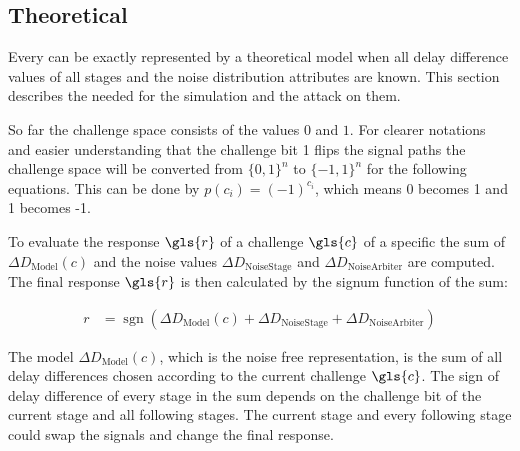 
\subsection{Theoretical}
\label{sec:theoretical}

Every \apuf can be exactly represented by a theoretical model when all delay difference values of all stages and the noise distribution attributes are known.
This section describes the \apufs needed for the simulation and the attack on them.

So far the challenge space consists of the values $0$ and $1$.
For clearer notations and easier understanding that the challenge bit 1 flips the signal paths the challenge space will be converted from $\{0, 1\}^n$ to $\{-1, 1\}^n$ for the following equations.
This can be done by $p(c_i) = (-1)^{c_i}$, which means 0 becomes 1 and 1 becomes -1.

To evaluate the response $\gls{r}$ of a challenge $\gls{c}$ of a specific \puf the sum of $\Delta D_{\mathrm{Model}}(c)$ and the noise values $\Delta D_{\mathrm{Noise Stage}}$ and $\Delta D_{\mathrm{Noise Arbiter}}$ are computed.
The final response $\gls{r}$ is then calculated by the signum function of the sum:

\begin{align}
r &= \operatorname{sgn}(\Delta D_{\mathrm{Model}}(c) + \Delta D_{\mathrm{Noise Stage}} + \Delta D_{\mathrm{Noise Arbiter}}) \label{equ:pufresponse}
\end{align}

The model $\Delta D_{\mathrm{Model}}(c)$, which is the noise free \apuf representation, is the sum of all delay differences chosen according to the current challenge $\gls{c}$.
The sign of delay difference of every stage in the sum depends on the challenge bit of the current stage and all following stages. %
The current stage and every following stage could swap the signals and change the final response.

